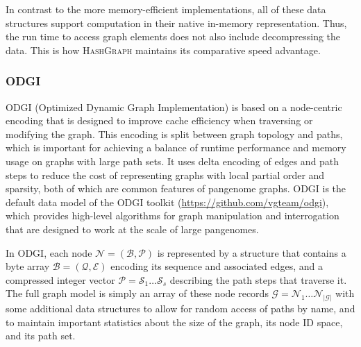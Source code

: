 \documentclass[11pt]{ucthesis}
\begin{document}
In contrast to the more memory-efficient implementations, all of these data structures support computation in their native in-memory representation.
Thus, the run time to access graph elements does not also include decompressing the data.
This is how \textsc{HashGraph} maintains its comparative speed advantage.


\subsubsection{\textsc{ODGI}}

\textsc{ODGI} (Optimized Dynamic Graph Implementation) is based on a node-centric encoding that is designed to improve cache efficiency when traversing or modifying the graph.
This encoding is split between graph topology and paths, which is important for achieving a balance of runtime performance and memory usage on graphs with large path sets.
It uses delta encoding of edges and path steps to reduce the cost of representing graphs with local partial order and sparsity, both of which are common features of pangenome graphs.
\textsc{ODGI} is the default data model of the \textsc{ODGI} toolkit (\url{https://github.com/vgteam/odgi}), which provides high-level algorithms for graph manipulation and interrogation that are designed to work at the scale of large pangenomes.

In \textsc{ODGI}, each node $\mathcal{N} = ( \mathcal{B}, \mathcal{P} )$ is represented by a structure that contains a byte array $\mathcal{B} = (\mathcal{Q}, \mathcal{E})$ encoding its sequence and associated edges, and a compressed integer vector $\mathcal{P} = \mathcal{S}_1 \ldots \mathcal{S}_{s}$ describing the path steps that traverse it.
The full graph model is simply an array of these node records $\mathcal{G} = \mathcal{N}_1 \ldots \mathcal{N}_{|\mathcal{G}|}$ with some additional data structures to allow for random access of paths by name, and to maintain important statistics about the size of the graph, its node ID space, and its path set.
\end{document}
